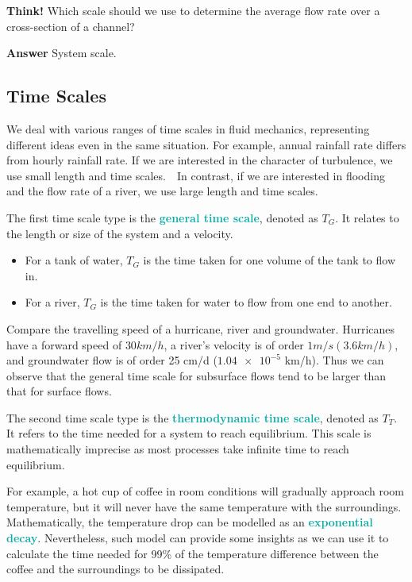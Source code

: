 \documentclass[twoside]{article}
\newcommand{\question}[1]{\begin{questionbox} \emoji{grapes} \textbf{Think!} \newline #1 \end{questionbox}}
\newcommand{\answer}[1]{\begin{answerbox} \emoji{melon} \textbf{Answer} \newline #1 \end{answerbox}}
\newcommand{\highlightbluetext}[1]{\textcolor[HTML]{09ACA6}{\textbf{#1}}}
\numberwithin{equation}{section}
\begin{document}
	\question{Which scale should we use to determine the average flow rate over a cross-section of a channel?}
	
	\answer{System scale.}
	
	\subsection{Time Scales}
	\label{subsec:TimeScales}
	
	We deal with various ranges of time scales in fluid mechanics, representing different ideas even in the same situation. For example, annual rainfall rate differs from hourly rainfall rate. If we are interested in the character of turbulence, we use small length and time scales.　In contrast, if we are interested in flooding and the flow rate of a river, we use large length and time scales.
	
	The first time scale type is the \highlightbluetext{general time scale}, denoted as $T_G$. It relates to the length or size of the system and a velocity.
	\begin{itemize}
		\item For a tank of water, $T_G$ is the time taken for one volume of the tank to flow in.
		\item For a river, $T_G$ is the time taken for water to flow from one end to another.
	\end{itemize}
	Compare the travelling speed of a hurricane, river and groundwater. Hurricanes have a forward speed of $30 \unit{km/h}$, a river's velocity is of order $1 \unit{m/s} (3.6 \unit{km/h})$, and groundwater flow is of order 25 cm/d ($\num{1.04e-5}$ km/h). Thus we can observe that the general time scale for subsurface flows tend to be larger than that for surface flows.
	
	The second time scale type is the \highlightbluetext{thermodynamic time scale}, denoted as $T_T$. It refers to the time needed for a system to reach equilibrium. This scale is mathematically imprecise as most processes take infinite time to reach equilibrium.
	
	For example, a hot cup of coffee in room conditions will gradually approach room temperature, but it will never have the same temperature with the surroundings. Mathematically, the temperature drop can be modelled as an \highlightbluetext{exponential decay}. Nevertheless, such model can provide some insights as we can use it to calculate the time needed for 99\% of the temperature difference between the coffee and the surroundings to be dissipated. 
	
\end{document}
